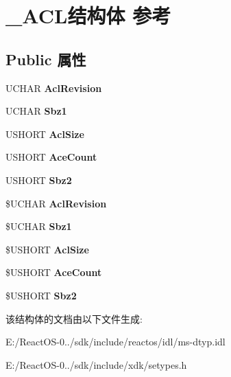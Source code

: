 \hypertarget{struct___a_c_l}{}\section{\+\_\+\+A\+C\+L结构体 参考}
\label{struct___a_c_l}
\subsection*{Public 属性}
\begin{DoxyCompactItemize}
\item 
\mbox{\label{struct___a_c_l_af0530f532005a2073a721e492f92afd1}} 
U\+C\+H\+AR {\bfseries Acl\+Revision}
\item 
\mbox{\label{struct___a_c_l_a6355b6d2ab7056dfb2538cb15be2078a}} 
U\+C\+H\+AR {\bfseries Sbz1}
\item 
\mbox{\label{struct___a_c_l_adcc539ec60449474c83a555f326d3710}} 
U\+S\+H\+O\+RT {\bfseries Acl\+Size}
\item 
\mbox{\label{struct___a_c_l_aaac225aa146d75e9a598696c5c02f5f3}} 
U\+S\+H\+O\+RT {\bfseries Ace\+Count}
\item 
\mbox{\label{struct___a_c_l_a19487f5773344defbe3967edb54f4e0b}} 
U\+S\+H\+O\+RT {\bfseries Sbz2}
\item 
\mbox{\label{struct___a_c_l_a076ef926e7f230c7a4401de7c41a327b}} 
\$U\+C\+H\+AR {\bfseries Acl\+Revision}
\item 
\mbox{\label{struct___a_c_l_a420915add006ae8fc761cb8fcd1cb0ae}} 
\$U\+C\+H\+AR {\bfseries Sbz1}
\item 
\mbox{\label{struct___a_c_l_a4a6b7ac45ea7e1b8fb6daf7439c9cecb}} 
\$U\+S\+H\+O\+RT {\bfseries Acl\+Size}
\item 
\mbox{\label{struct___a_c_l_a755dfde4d0a78f1bfd32d5e6b40e1826}} 
\$U\+S\+H\+O\+RT {\bfseries Ace\+Count}
\item 
\mbox{\label{struct___a_c_l_a12c1e123c85f0e6e68bf19c9a1468c93}} 
\$U\+S\+H\+O\+RT {\bfseries Sbz2}
\end{DoxyCompactItemize}


该结构体的文档由以下文件生成\+:\begin{DoxyCompactItemize}
\item 
E\+:/\+React\+O\+S-\/0../sdk/include/reactos/idl/ms-\/dtyp.\+idl\item 
E\+:/\+React\+O\+S-\/0../sdk/include/xdk/setypes.\+h\end{DoxyCompactItemize}
